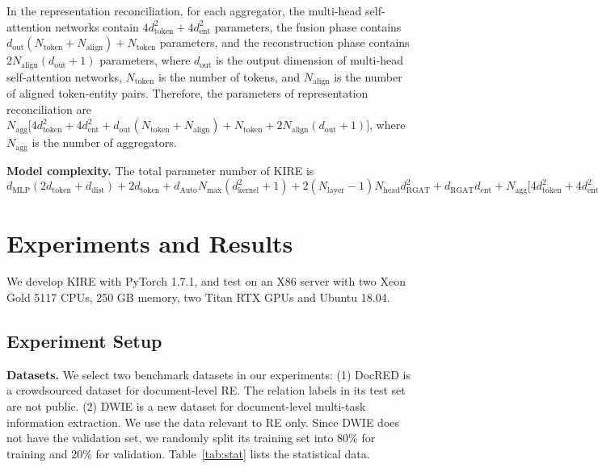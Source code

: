 \documentclass[runningheads]{llncs}
\begin{document}
In the representation reconciliation, for each aggregator, the multi-head self-attention networks contain $4d_\text{token}^2+4d_\text{ent}^2$ parameters, the fusion phase contains $d_\text{out}(N_\text{token}+N_\text{align})+N_\text{token}$ parameters, and the reconstruction phase contains $2N_\text{align}(d_\text{out}+1)$ parameters, where $d_\text{out}$ is the output dimension of multi-head self-attention networks, $N_\text{token}$ is the number of tokens, and $N_\text{align}$ is the number of aligned token-entity pairs. 
Therefore, the parameters of representation reconciliation are $N_\text{agg}\big[4d_\text{token}^2+4d_\text{ent}^2+d_\text{out}(N_\text{token}+N_\text{align})+N_\text{token}+2N_\text{align}(d_\text{out}+1)\big]$, where $N_\text{agg}$ is the number of aggregators.

\textbf{Model complexity.}
The total parameter number of KIRE is $d_\text{MLP}(2d_\text{token}+d_\text{dist})+2d_\text{token}+d_\text{Auto}N_\text{max}(d_\text{kernel}^2+1)+2(N_\text{layer}-1)N_\text{head}d_\text{RGAT}^2+d_\text{RGAT}d_\text{ent} + N_\text{agg}\big[4d_\text{token}^2+4d_\text{ent}^2 +d_\text{out}(N_\text{token}+N_\text{align})+N_\text{token}+2N_\text{align}(d_\text{out}+1)\big].$


\section{Experiments and Results}
\label{sect:exp}

We develop KIRE with PyTorch 1.7.1, and test on an X86 server with two Xeon Gold 5117 CPUs, 250 GB memory, two Titan RTX GPUs and Ubuntu 18.04. 


\subsection{Experiment Setup}
\label{subsect:setup}

\textbf{Datasets.} 
We select two benchmark datasets in our experiments:
(1) DocRED \cite{yao2019docred} is a crowdsourced dataset for document-level RE.
The relation labels in its test set are not public.
(2) DWIE \cite{zaporojets2021dwie} is a new dataset for document-level multi-task information extraction. 
We use the data relevant to RE only.
Since DWIE does not have the validation set, we randomly split its training set into 80\% for training and 20\% for validation. Table~\ref{tab:stat} lists the statistical data.
\end{document}
